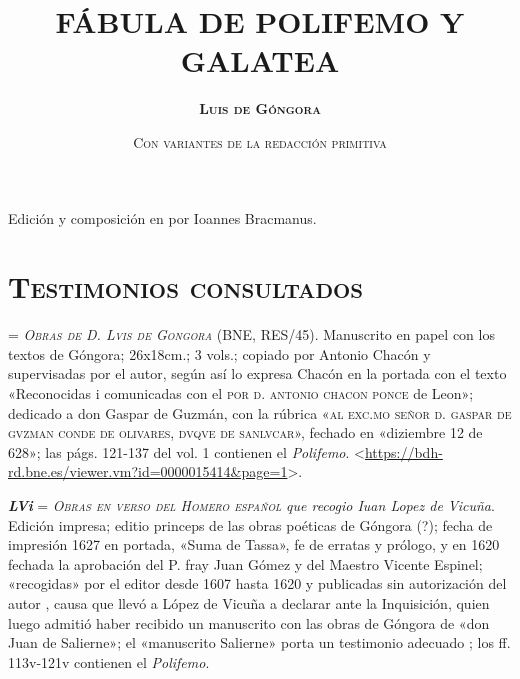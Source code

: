 \documentclass[11pt,twoside]{article}
\title{\huge\textbf{FÁBULA DE POLIFEMO Y GALATEA}}
\author{\huge\textsc{\textbf{Luis de Góngora}}}
\date{\vspace{60pt}\textsc{Con variantes de la redacción primitiva}\\\fontsize{60}{11}\selectfont{\vfill\textbf{\texttt{\LaTeX}}}}
\newcommand{\ch}{\emph{\textbf{Ch}}}
\newcommand{\lvi}{\emph{\textbf{LVi}}}
\begin{document}
	{
			\maketitle
		}
		\newpage%
%
\null
\vfill
\begin{flushright}
	Edición y composición en \texttt{\XeLaTeX} por Ioannes Bracmanus.
\end{flushright}
\newpage
%
\tableofcontents
\newpage
%
\setcounter{page}{1}
\section*{\raggedleft\textsc{Testimonios consultados}}
%
\noindent{\ch} = \emph{\textsc{Obras de D. Lvis de Gongora}} (BNE, RES/45).
%
Manuscrito en papel con los textos de Góngora; 26x18cm.; 3 vols.; copiado por Antonio Chacón y supervisadas por el autor, según así lo expresa Chacón en la portada con el texto «Reconocidas i comunicadas con el \textsc{por d. antonio chacon ponce} de Leon»; dedicado a don Gaspar de Guzmán, con la rúbrica «\textsc{al exc.mo señor d. gaspar de gvzman conde de olivares, dvqve de sanlvcar}», fechado en «diziembre 12 de 628»; las págs. 121-137 del vol. 1 contienen el \emph{Polifemo}. <\url{https://bdh-rd.bne.es/viewer.vm?id=0000015414\&page=1}>.\par
%
{\lvi} = \emph{\textsc{Obras en verso del Homero español}} \emph{que recogio Iuan Lopez de Vicuña}.
%
Edición impresa; editio princeps de las obras poéticas de Góngora (?); fecha de impresión 1627 en portada, «Suma de Tassa», fe de erratas y prólogo, y en 1620 fechada la aprobación del P. fray Juan Gómez y del Maestro Vicente Espinel; «recogidas» por el editor desde 1607 hasta 1620 y publicadas sin autorización del autor \parencite{Alonso1963}, causa que llevó a López de Vicuña a declarar ante la Inquisición, quien luego admitió haber recibido un manuscrito con las obras de Góngora de «don Juan de Salierne»; el «manuscrito Salierne» porta un testimonio adecuado \parencite{Alonso1963}; los ff. 113v-121v contienen el \emph{Polifemo}.\par
\end{document}
